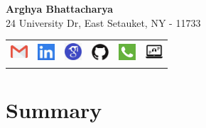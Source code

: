 \documentclass[letterpaper,10pt]{article}
\begin{document}
\begin{center}
\textbf{{\Huge Arghya Bhattacharya}} \\
\vspace{5pt}
{24 University Dr, East Setauket, NY - 11733} \\
\bigskip

\begin{tabular*}{\textwidth}{ m{3.5cm} m{3.5cm} m{3.5cm} m{3.5cm} m{3.5cm} m{3.5cm} }
\underline{\href{mailto:argbhattacha@cs.stonybrook.edu}{\includegraphics[width=0.25in,height=0.20in]{Figures/email.png}}} &
\underline{{\href{https://www.linkedin.com/in/reach-arghya-bhattacharya/}{\includegraphics[width=0.25in,height=0.25in]{Figures/linkedin.png}}}} &
\underline{{\href{https://scholar.google.com/citations?user=tvw7c5wAAAAJ&hl=en}{\includegraphics[width=0.25in,height=0.25in]{Figures/googlescholar.png}}}} &
\underline{{\href{https://github.com/ArghyaB118}{\includegraphics[width=0.25in,height=0.25in]{Figures/github.png}}}} &
\underline{\href{tel:(+1)934-777-9896}{\includegraphics[width=0.25in,height=0.25in]{Figures/call.png}}} &
\underline{\href{https://www3.cs.stonybrook.edu/~argbhattacha/}{\includegraphics[width=0.25in,height=0.30in]{Figures/webpage.png}}} \\
\end{tabular*}
\end{center}

\section{Summary}
\end{document}
